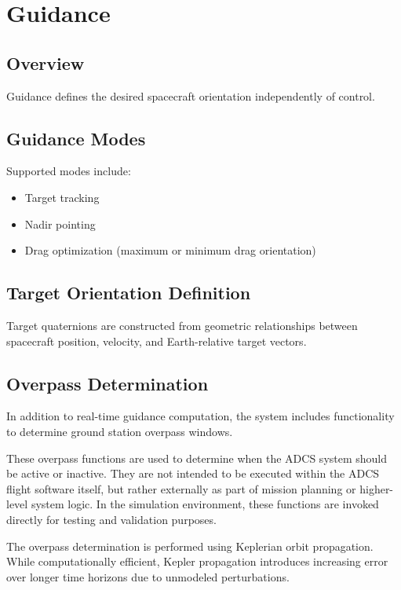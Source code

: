 \chapter{Guidance}

\section{Overview}

Guidance defines the desired spacecraft orientation independently of control.

\section{Guidance Modes}

Supported modes include:

\begin{itemize}
	\item Target tracking
	\item Nadir pointing
	\item Drag optimization (maximum or minimum drag orientation)
\end{itemize}

\section{Target Orientation Definition}

Target quaternions are constructed from geometric relationships between spacecraft position, velocity, and Earth-relative target vectors.

\section{Overpass Determination}

In addition to real-time guidance computation, the system includes functionality to determine ground station overpass windows.

These overpass functions are used to determine when the ADCS system should be active or inactive. They are not intended to be executed within the ADCS flight software itself, but rather externally as part of mission planning or higher-level system logic. In the simulation environment, these functions are invoked directly for testing and validation purposes.

The overpass determination is performed using Keplerian orbit propagation. While computationally efficient, Kepler propagation introduces increasing error over longer time horizons due to unmodeled perturbations.

